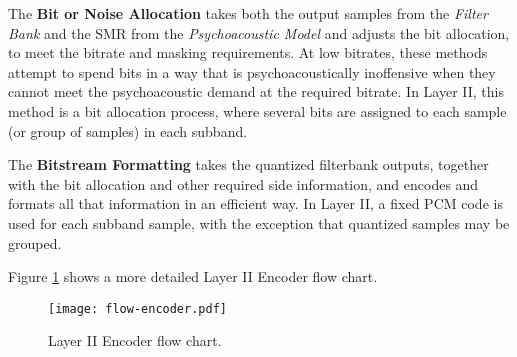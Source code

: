 The \textbf{Bit or Noise Allocation} takes both the output samples from the \textit{Filter Bank} and the SMR from the \textit{Psychoacoustic Model} and adjusts the bit allocation, to meet the bitrate and masking requirements. At low bitrates, these methods attempt to spend bits in a way that is psychoacoustically inoffensive when they cannot meet the psychoacoustic demand at the required bitrate.
In Layer II, this method is a bit allocation process, where several bits are assigned to each sample (or group of samples) in each subband.

The \textbf{Bitstream Formatting} takes the quantized filterbank outputs, together with the bit allocation and other required side information, and encodes and formats all that information in an efficient way.
In Layer II, a fixed PCM code is used for each subband sample, with the exception that quantized samples may be grouped.

Figure \ref{fig:flow-encoder} shows a more detailed Layer II Encoder flow chart.

\begin{figure}[H]
\centerline{\texttt{[image: flow-encoder.pdf]}}
\caption{Layer II Encoder flow chart.}
\label{fig:flow-encoder}
\end{figure}